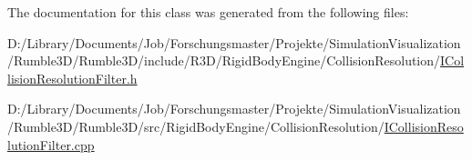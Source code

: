 The documentation for this class was generated from the following files\+:\begin{DoxyCompactItemize}
\item 
D\+:/\+Library/\+Documents/\+Job/\+Forschungsmaster/\+Projekte/\+Simulation\+Visualization/\+Rumble3\+D/\+Rumble3\+D/include/\+R3\+D/\+Rigid\+Body\+Engine/\+Collision\+Resolution/\mbox{\hyperlink{_i_collision_resolution_filter_8h}{I\+Collision\+Resolution\+Filter.\+h}}\item 
D\+:/\+Library/\+Documents/\+Job/\+Forschungsmaster/\+Projekte/\+Simulation\+Visualization/\+Rumble3\+D/\+Rumble3\+D/src/\+Rigid\+Body\+Engine/\+Collision\+Resolution/\mbox{\hyperlink{_i_collision_resolution_filter_8cpp}{I\+Collision\+Resolution\+Filter.\+cpp}}\end{DoxyCompactItemize}
